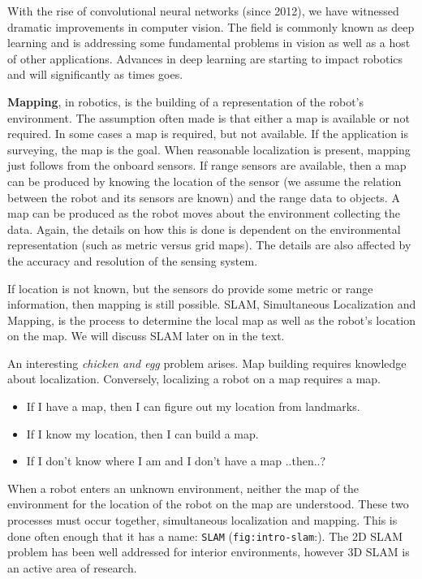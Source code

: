 With the rise of convolutional neural networks (since 2012), we have
witnessed dramatic improvements in computer vision. The field is
commonly known as deep learning and is addressing some fundamental
problems in vision as well as a host of other applications. Advances in
deep learning are starting to impact robotics and will significantly as
times goes.

\textbf{Mapping}, in robotics, is the building of a representation of
the robot's environment. The assumption often made is that either a map
is available or not required. In some cases a map is required, but not
available. If the application is surveying, the map is the goal. When
reasonable localization is present, mapping just follows from the
onboard sensors. If range sensors are available, then a map can be
produced by knowing the location of the sensor (we assume the relation
between the robot and its sensors are known) and the range data to
objects. A map can be produced as the robot moves about the environment
collecting the data. Again, the details on how this is done is dependent
on the environmental representation (such as metric versus grid maps).
The details are also affected by the accuracy and resolution of the
sensing system.

If location is not known, but the sensors do provide some metric or
range information, then mapping is still possible. SLAM, Simultaneous
Localization and Mapping, is the process to determine the local map as
well as the robot's location on the map. We will discuss SLAM later on
in the text.

An interesting \emph{chicken and egg} problem arises. Map building
requires knowledge about localization. Conversely, localizing a robot on
a map requires a map.

\begin{itemize}
\tightlist
\item
  If I have a map, then I can figure out my location from landmarks.
\item
  If I know my location, then I can build a map.
\item
  If I don't know where I am and I don't have a map ..then..?
\end{itemize}

When a robot enters an unknown environment, neither the map of the
environment for the location of the robot on the map are understood.
These two processes must occur together, simultaneous localization and
mapping. This is done often enough that it has a name: \texttt{SLAM}
(\texttt{fig:intro-slam}:). The 2D SLAM problem has been well addressed
for interior environments, however 3D SLAM is an active area of
research.


